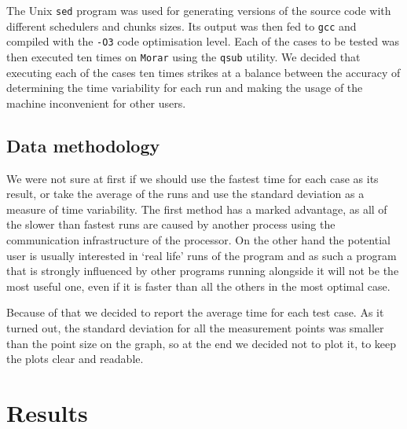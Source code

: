 \documentclass[11pt,a4paper]{article}
\begin{document}
The Unix \texttt{sed} program was used for generating versions of the source code with different schedulers and chunks sizes. Its output was then fed to \texttt{gcc} and compiled with the \texttt{-O3} code optimisation level. Each of the cases to be tested was then executed ten times on \texttt{Morar} using the \texttt{qsub} utility. We decided that executing each of the cases ten times strikes at a balance between the accuracy of determining the time variability for each run and making the usage of the machine inconvenient for other users.

\subsection{Data methodology}
We were not sure at first if we should use the fastest time for each case as its result, or take the average of the runs and use the standard deviation as a measure of time variability. The first method has a marked advantage, as all of the slower than fastest runs are caused by another process using the communication infrastructure of the processor. On the other hand the potential user is usually interested in `real life' runs of the program and as such a program that is strongly influenced by other programs running alongside it will not be the most useful one, even if it is faster than all the others in the most optimal case. 

Because of that we decided to report the average time for each test case. As it turned out, the standard deviation for all the measurement points was smaller than the point size on the graph, so at the end we decided not to plot it, to keep the plots clear and readable.

\section{Results}
\end{document}
